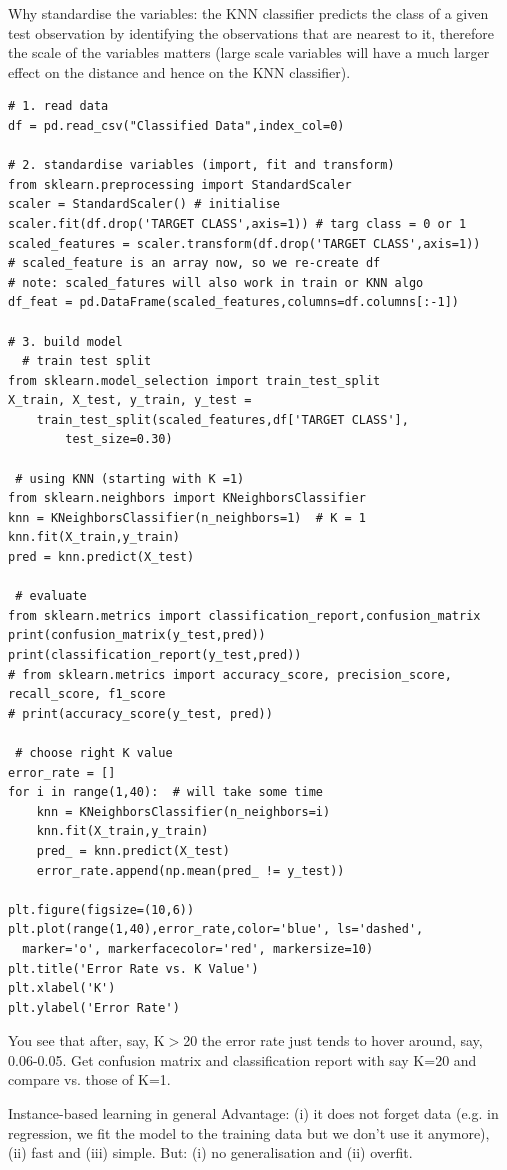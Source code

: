 \documentclass[11pt]{article}
\begin{document}
Why standardise the variables: the KNN classifier predicts the class of a given test observation by identifying the observations that are nearest to it, therefore the scale of the variables matters (large scale variables will have a much larger effect on the distance and hence on the KNN classifier).
\begin{lstlisting}
# 1. read data
df = pd.read_csv("Classified Data",index_col=0)

# 2. standardise variables (import, fit and transform)
from sklearn.preprocessing import StandardScaler
scaler = StandardScaler() # initialise
scaler.fit(df.drop('TARGET CLASS',axis=1)) # targ class = 0 or 1
scaled_features = scaler.transform(df.drop('TARGET CLASS',axis=1))
# scaled_feature is an array now, so we re-create df
# note: scaled_fatures will also work in train or KNN algo
df_feat = pd.DataFrame(scaled_features,columns=df.columns[:-1])

# 3. build model
  # train test split
from sklearn.model_selection import train_test_split
X_train, X_test, y_train, y_test = 
	train_test_split(scaled_features,df['TARGET CLASS'],
		test_size=0.30)

 # using KNN (starting with K =1)
from sklearn.neighbors import KNeighborsClassifier
knn = KNeighborsClassifier(n_neighbors=1)  # K = 1
knn.fit(X_train,y_train)
pred = knn.predict(X_test)
 
 # evaluate
from sklearn.metrics import classification_report,confusion_matrix
print(confusion_matrix(y_test,pred))
print(classification_report(y_test,pred))
# from sklearn.metrics import accuracy_score, precision_score, recall_score, f1_score
# print(accuracy_score(y_test, pred))

 # choose right K value
error_rate = []
for i in range(1,40):  # will take some time
	knn = KNeighborsClassifier(n_neighbors=i)
	knn.fit(X_train,y_train)
	pred_ = knn.predict(X_test)
	error_rate.append(np.mean(pred_ != y_test))

plt.figure(figsize=(10,6))
plt.plot(range(1,40),error_rate,color='blue', ls='dashed', 
  marker='o', markerfacecolor='red', markersize=10)
plt.title('Error Rate vs. K Value')
plt.xlabel('K')
plt.ylabel('Error Rate')
\end{lstlisting}
You see that after, say, K$>$20 the error rate just tends to hover around, say, 0.06-0.05. Get confusion matrix and classification report with say K=20 and compare vs. those of K=1.

Instance-based learning in general
Advantage: (i) it does not forget data (e.g. in regression, we fit the model to the training data but we don't use it anymore), (ii) fast and (iii) simple. But: (i) no generalisation and (ii) overfit.
\end{document}
